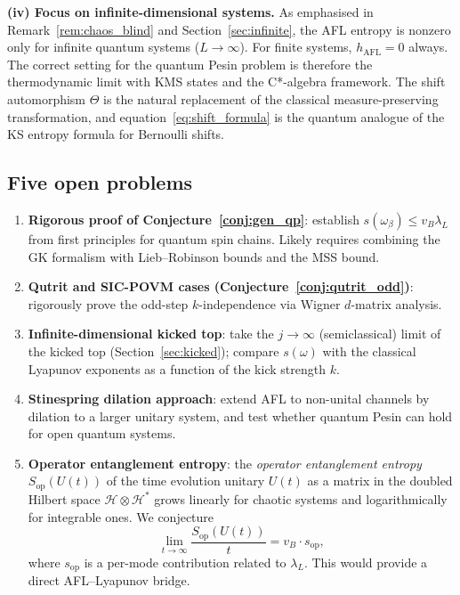 \documentclass[12pt,a4paper]{article}
\begin{document}
\medskip\noindent
\textbf{(iv) Focus on infinite-dimensional systems.}
As emphasised in Remark~\ref{rem:chaos_blind} and Section~\ref{sec:infinite}, the AFL
entropy is nonzero only for infinite quantum systems ($L \to \infty$).  For finite
systems, $h_{\mathrm{AFL}} = 0$ always.  The correct setting for the quantum Pesin
problem is therefore the thermodynamic limit with KMS states and the C*-algebra
framework.  The shift automorphism $\Theta$ is the natural replacement of the
classical measure-preserving transformation, and equation~\eqref{eq:shift_formula}
is the quantum analogue of the KS entropy formula for Bernoulli shifts.

\subsection{Five open problems}

\begin{enumerate}
  \item \textbf{Rigorous proof of Conjecture~\ref{conj:gen_qp}}: establish
        $s(\omega_\beta) \leq v_B \lambda_L$ from first principles for quantum spin
        chains.  Likely requires combining the GK formalism with Lieb--Robinson bounds
        and the MSS bound.

  \item \textbf{Qutrit and SIC-POVM cases (Conjecture~\ref{conj:qutrit_odd})}: rigorously
        prove the odd-step $k$-independence via Wigner $d$-matrix analysis.

  \item \textbf{Infinite-dimensional kicked top}: take the $j \to \infty$ (semiclassical)
        limit of the kicked top (Section~\ref{sec:kicked}); compare $s(\omega)$ with
        the classical Lyapunov exponents as a function of the kick strength $k$.

  \item \textbf{Stinespring dilation approach}: extend AFL to non-unital channels by
        dilation to a larger unitary system, and test whether quantum Pesin can hold
        for open quantum systems.

  \item \textbf{Operator entanglement entropy}: the \emph{operator entanglement entropy}
        $S_{\mathrm{op}}(U(t))$ of the time evolution unitary $U(t)$ as a matrix in the
        doubled Hilbert space $\mathcal{H} \otimes \mathcal{H}^*$ grows linearly for
        chaotic systems and logarithmically for integrable ones.  We conjecture
        \[
          \lim_{t \to \infty} \frac{S_{\mathrm{op}}(U(t))}{t}
          = v_B \cdot s_{\mathrm{op}},
        \]
        where $s_{\mathrm{op}}$ is a per-mode contribution related to $\lambda_L$.
        This would provide a direct AFL--Lyapunov bridge.
\end{enumerate}
\end{document}
